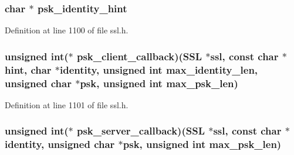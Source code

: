 \subsubsection[{\texorpdfstring{psk\+\_\+identity\+\_\+hint}{psk_identity_hint}}]{\setlength{\rightskip}{0pt plus 5cm}char $\ast$ psk\+\_\+identity\+\_\+hint}\hypertarget{structssl__ctx__st_ac93ab51ca7a64a11e87278ef4ab3fcd9}{}\label{structssl__ctx__st_ac93ab51ca7a64a11e87278ef4ab3fcd9}


Definition at line 1100 of file ssl.\+h.

\subsubsection[{\texorpdfstring{psk\+\_\+client\+\_\+callback}{psk_client_callback}}]{\setlength{\rightskip}{0pt plus 5cm}unsigned int($\ast$ psk\+\_\+client\+\_\+callback)({\bf S\+SL} $\ast$ssl, const char $\ast$hint, char $\ast$identity, unsigned int max\+\_\+identity\+\_\+len, unsigned char $\ast$psk, unsigned int max\+\_\+psk\+\_\+len)}\hypertarget{structssl__ctx__st_a71fd3455fac589a1f9bdc9f8520aa4e5}{}\label{structssl__ctx__st_a71fd3455fac589a1f9bdc9f8520aa4e5}


Definition at line 1101 of file ssl.\+h.

\subsubsection[{\texorpdfstring{psk\+\_\+server\+\_\+callback}{psk_server_callback}}]{\setlength{\rightskip}{0pt plus 5cm}unsigned int($\ast$ psk\+\_\+server\+\_\+callback)({\bf S\+SL} $\ast$ssl, const char $\ast$identity, unsigned char $\ast$psk, unsigned int max\+\_\+psk\+\_\+len)}\hypertarget{structssl__ctx__st_add4c613e3361a1ec0167149c336ea84d}{}\label{structssl__ctx__st_add4c613e3361a1ec0167149c336ea84d}


